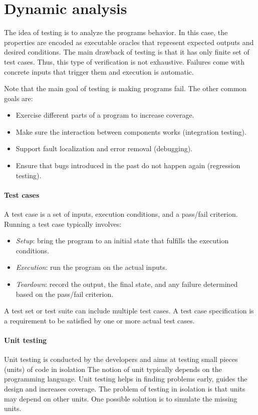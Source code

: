 \section{Dynamic analysis}

The idea of testing is to analyze the programs behavior. 
In this case, the properties are encoded as executable oracles that represent expected outputs and desired conditions. 
The main drawback of testing is that it has only finite set of test cases. 
Thus, this type of verification is not exhaustive. 
Failures come with concrete inputs that trigger them and execution is automatic. 

Note that the main goal of testing is making programs fail. 
The other common goals are: 
\begin{itemize}
    \item Exercise different parts of a program to increase coverage.
    \item Make sure the interaction between components works (integration testing).
    \item Support fault localization and error removal (debugging).
    \item Ensure that bugs introduced in the past do not happen again (regression testing).
\end{itemize}

\paragraph*{Test cases}
A test case is a set of inputs, execution conditions, and a pass/fail criterion.
Running a test case typically involves: 
\begin{itemize}
    \item \textit{Setup}: bring the program to an initial state that fulfills the execution conditions.
    \item \textit{Execution}: run the program on the actual inputs.
    \item \textit{Teardown}: record the output, the final state, and any failure determined based on the pass/fail criterion.
\end{itemize}
A test set or test suite can include multiple test cases.
A test case specification is a requirement to be satisfied by one or more actual test cases. 

\paragraph*{Unit testing}
Unit testing is conducted by the developers and aims at testing small pieces (units) of code in isolation
The notion of unit typically depends on the programming language.
Unit testing helps in finding problems early, guides the design and increases coverage. 
The problem of testing in isolation is that units may depend on other units. 
One possible solution is to simulate the missing units. 

